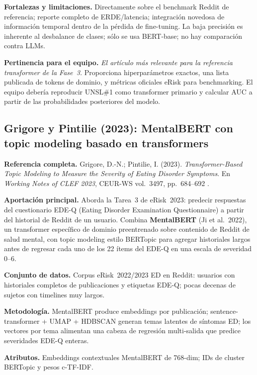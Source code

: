 \documentclass[journal]{IEEEtran}
\begin{document}
\textbf{Fortalezas y limitaciones.} Directamente sobre el benchmark Reddit de referencia; reporte completo de ERDE/latencia; integración novedosa de información temporal dentro de la pérdida de fine-tuning. La baja precisión es inherente al desbalance de clases; sólo se usa BERT-base; no hay comparación contra LLMs.

\textbf{Pertinencia para el equipo.} \emph{El artículo más relevante para la referencia transformer de la Fase~3.} Proporciona hiperparámetros exactos, una lista publicada de tokens de dominio, y métricas oficiales eRisk para benchmarking. El equipo debería reproducir UNSL\#1 como transformer primario y calcular AUC a partir de las probabilidades posteriores del modelo.

\subsection{Grigore y Pintilie (2023): MentalBERT con topic modeling basado en transformers}

\textbf{Referencia completa.} Grigore, D.-N.; Pintilie, I. (2023). \emph{Transformer-Based Topic Modeling to Measure the Severity of Eating Disorder Symptoms}. En \textit{Working Notes of CLEF 2023}, CEUR-WS vol.~3497, pp.~684--692 \cite{grigore2023mentalbert}.

\textbf{Aportación principal.} Aborda la Tarea~3 de eRisk~2023: predecir respuestas del cuestionario EDE-Q (Eating Disorder Examination Questionnaire) a partir del historial de Reddit de un usuario. Combina \textbf{MentalBERT} (Ji et al.~2022), un transformer específico de dominio preentrenado sobre contenido de Reddit de salud mental, con topic modeling estilo BERTopic para agregar historiales largos antes de regresar cada uno de los 22 ítems del EDE-Q en una escala de severidad 0--6.

\textbf{Conjunto de datos.} Corpus eRisk~2022/2023 ED en Reddit: usuarios con historiales completos de publicaciones y etiquetas EDE-Q; pocas decenas de sujetos con timelines muy largos.

\textbf{Metodología.} MentalBERT produce embeddings por publicación; sentence-transformer + UMAP + HDBSCAN generan temas latentes de síntomas ED; los vectores por tema alimentan una cabeza de regresión multi-salida que predice severidades EDE-Q enteras.

\textbf{Atributos.} Embeddings contextuales MentalBERT de 768-dim; IDs de cluster BERTopic y pesos c-TF-IDF.
\end{document}
